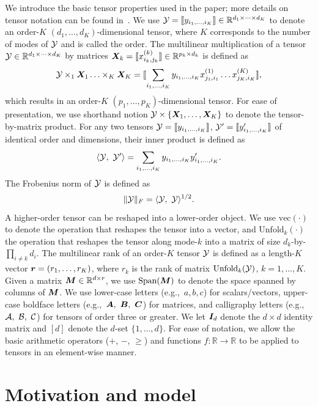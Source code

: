 \documentclass[12pt]{article}
\theoremstyle{plain}
\theoremstyle{definition}
\begin{document}
We introduce the basic tensor properties used in the paper; more details on tensor notation can be found in~\citet{kolda2009tensor}. We use $\mathcal{Y}=\llbracket y_{i_1,\ldots,i_K} \rrbracket\in \mathbb{R}^{d_1\times \cdots\times d_K}$ to denote an order-$K$ $(d_1,\ldots,d_K)$-dimensional tensor, where $K$ corresponds to the number of modes of $\mathcal{Y}$ and is called the order. The multilinear multiplication of a tensor $\mathcal{Y}\in\mathbb{R}^{d_1\times \cdots\times d_K}$ by matrices $\bm X_k=\llbracket x_{i_k,j_k}^{(k)} \rrbracket\in\mathbb{R}^{p_k\times d_k}$ is defined as
\begin{equation}
\mathcal{Y} \times_1\bm X_1\ldots \times_K \bm X_K=\llbracket \sum_{i_1,\ldots,i_K}y_{i_1,\ldots,i_K}x_{j_1,i_1}^{(1)}\ldots x_{j_K,i_K}^{(K)} \rrbracket,
\end{equation}
which results in an order-$K$ $(p_1,\ldots,p_K)$-dimensional tensor. For ease of presentation, we use shorthand notion $\mathcal{Y}\times\{\bm X_1,\ldots,\bm X_K\}$ to denote the tensor-by-matrix product. For any two tensors $\mathcal{Y}=\llbracket y_{i_1,\ldots,i_K} \rrbracket$, $\mathcal{Y}'=\llbracket y'_{i_1,\ldots,i_K} \rrbracket$ of identical order and dimensions, their inner product is defined as 
\[
\langle \mathcal{Y},\ \mathcal{Y}'\rangle =\sum_{i_1,\ldots,i_K}y_{i_1,\ldots,i_K}y'_{i_1,\ldots,i_K}.
\] 
The Frobenius norm of $\mathcal{Y}$ is defined as 
\[
\lVert\mathcal{Y}\rVert_F=\langle \mathcal{Y},\ \mathcal{Y} \rangle^{1/2}.
\]
A higher-order tensor can be reshaped into a lower-order object. We use $\text{vec}(\cdot)$ to denote the operation that reshapes the tensor into a vector, and $\text{Unfold}_k(\cdot)$ the operation that reshapes the tensor along mode-$k$ into a matrix of size $d_k$-by-$\prod_{i\neq k}d_i$. The multilinear rank of an order-$K$ tensor $\mathcal{Y}$ is defined as a length-$K$ vector $\bm{r}=(r_1,\ldots,r_K)$, where $r_k$ is the rank of matrix $\text{Unfold}_k(\mathcal{Y})$, $k=1,\ldots,K$. Given a matrix $\bm M\in\mathbb{R}^{d\times r}$, we use $\text{Span}(\bm M)$ to denote the space spanned by columns of $\bm M$. We use lower-case letters (e.g.,\ $a,b,c$) for scalars/vectors, upper-case boldface letters (e.g.,\ $\bm A,\ \bm B,\ \bm C$) for matrices, and calligraphy letters (e.g.,\ $\tA,\ \tB, \ \tC$) for tensors of order three or greater. We let $\bm I_d$ denote the $d \times d$ identity matrix and $[d]$ denote the $d$-set $\{1,\ldots,d\}$. For ease of notation, we allow the basic arithmetic operators ($+$, $-$, $\geq $) and functions $f\colon \mathbb{R}\to \mathbb{R}$ to be applied to tensors in an element-wise manner.

\section{Motivation and model}\label{sec:model}
\end{document}
